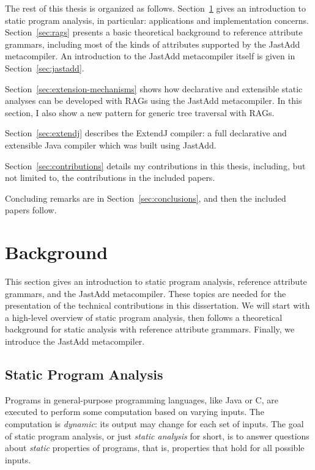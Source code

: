 \documentclass[10pt, twoside, openright]{book}
\newcommand{\secref}[1]{Section~\ref{#1}}
\begin{document}
The rest of this thesis is organized as follows.
\secref{sec:background} gives an introduction to static program analysis, in particular:
applications and implementation concerns.
\secref{sec:rags} presents a basic theoretical background to
reference attribute grammars, including
most of the kinds of attributes supported by the JastAdd metacompiler. An introduction to
the JastAdd metacompiler
itself is given in \secref{sec:jastadd}.

\secref{sec:extension-mechanisms} shows how declarative and extensible static analyses can be
developed with RAGs using the JastAdd metacompiler. In this section, I also show a new pattern
for generic tree traversal with RAGs.

\secref{sec:extendj} describes the ExtendJ compiler:
a full declarative and extensible Java compiler which was built using JastAdd.

\secref{sec:contributions} details my contributions in this thesis, including, but not limited
to, the contributions in the included papers.

Concluding remarks are in \secref{sec:conclusions}, and then the included papers follow.

\section{Background}
\label{sec:background}

This section gives an introduction to static program analysis, reference attribute grammars,
and the JastAdd metacompiler. These topics are needed for the presentation of
the technical contributions in this dissertation.
We will start with a high-level overview of static program analysis, then
follows a theoretical background for static analysis with reference attribute grammars.
Finally, we introduce the JastAdd metacompiler.

\subsection{Static Program Analysis}

Programs in general-purpose programming languages, like Java or C, are executed
to perform some computation based on varying inputs.
The computation is \mbox{\emph{dynamic}:} its output may change for each set of inputs.
The goal of static program analysis, or just \emph{static analysis} for short,
is to answer questions about \emph{static} properties
of programs, that is, properties that hold for all possible inputs.
\end{document}
